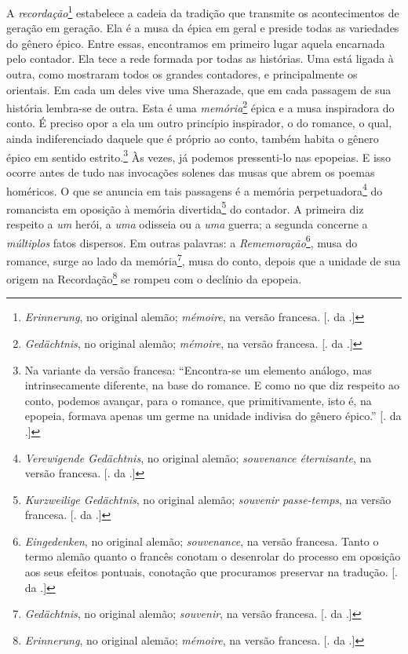 A \emph{recordação}\footnote{\emph{Erinnerung}, no original alemão;
  \emph{mémoire}, na versão francesa. [. da .]} estabelece a
cadeia da tradição que transmite os acontecimentos de geração em
geração. Ela é a musa da épica em geral e preside todas as variedades do
gênero épico. Entre essas, encontramos em primeiro lugar aquela
encarnada pelo contador. Ela tece a rede formada por todas as histórias.
Uma está ligada à outra, como mostraram todos os grandes contadores, e
principalmente os orientais. Em cada um deles vive uma Sherazade, que em
cada passagem de sua história lembra-se de outra. Esta é uma
\emph{memória}\footnote{\emph{Gedächtnis}, no original alemão;
  \emph{mémoire}, na versão francesa. [. da .]} épica e a musa
inspiradora do conto. É preciso opor a ela um outro princípio
inspirador, o do romance, o qual, ainda indiferenciado daquele que é
próprio ao conto, também habita o gênero épico em sentido
estrito.\footnote{Na variante da versão francesa: ``Encontra-se um
  elemento análogo, mas intrinsecamente diferente, na base do romance. E
  como no que diz respeito ao conto, podemos avançar, para o romance,
  que primitivamente, isto é, na epopeia, formava apenas um germe na
  unidade indivisa do gênero épico.'' [. da .]} Às vezes, já
podemos pressenti-lo nas epopeias. E isso ocorre antes de tudo nas
invocações solenes das musas que abrem os poemas homéricos. O que se
anuncia em tais passagens é a memória perpetuadora\footnote{\emph{Verewigende
  Gedächtnis}, no original alemão; \emph{souvenance éternisante}, na
  versão francesa. [. da .]} do romancista em oposição à memória
divertida\footnote{\emph{Kurzweilige Gedächtnis}, no original alemão;
  \emph{souvenir passe-temps}, na versão francesa. [. da .]} do
contador. A primeira diz respeito a \emph{um} herói, a \emph{uma}
odisseia ou a \emph{uma} guerra; a segunda concerne a \emph{múltiplos}
fatos dispersos. Em outras palavras: a \emph{Rememoração}\footnote{\emph{Eingedenken},
  no original alemão; \emph{souvenance}, na versão francesa. Tanto o
  termo alemão quanto o francês conotam o desenrolar do processo em
  oposição aos seus efeitos pontuais, conotação que procuramos preservar
  na tradução. [. da .]}, musa do romance, surge ao lado da
memória\footnote{\emph{Gedächtnis}, no original alemão; \emph{souvenir},
  na versão francesa. [. da .]}, musa do conto, depois que a
unidade de sua origem na Recordação\footnote{\emph{Erinnerung}, no
  original alemão; \emph{mémoire}, na versão francesa. [. da .]}
se rompeu com o declínio da epopeia.

